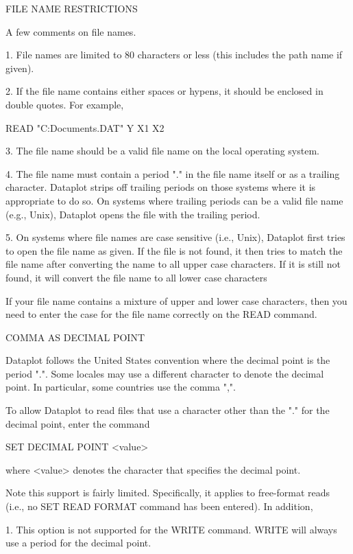 FILE NAME RESTRICTIONS

A few comments on file names.

  1. File names are limited to 80 characters or less (this includes
     the path name if given).

  2. If the file name contains either spaces or hypens, it
     should be enclosed in double quotes.  For example,

       READ "C:\My Documents\SAMPLE.DAT"  Y X1 X2

  3. The file name should be a valid file name on the local
     operating system.

  4. The file name must contain a period "." in the file name itself
     or as a trailing character.  Dataplot strips off trailing periods
     on those systems where it is appropriate to do so.  On systems
     where trailing periods can be a valid file name (e.g., Unix),
     Dataplot opens the file with the trailing period.
 
  5. On systems where file names are case sensitive (i.e., Unix),
     Dataplot first tries to open the file name as given.  If the
     file is not found, it then tries to match the file name
     after converting the name to all upper case characters.  If
     it is still not found, it will convert the file name to all
     lower case characters

     If your file name contains a mixture of upper and lower case
     characters, then you need to enter the case for the file name
     correctly on the READ command.


COMMA AS DECIMAL POINT

Dataplot follows the United States convention where the decimal
point is the period ".".  Some locales may use a different
character to denote the decimal point.  In particular, some
countries use the comma ",".

To allow Dataplot to read files that use a character other than
the "." for the decimal point, enter the command

     SET DECIMAL POINT <value>

where <value> denotes the character that specifies the decimal
point.

Note this support is fairly limited.  Specifically, it applies
to free-format reads (i.e., no SET READ FORMAT command has been
entered).  In addition,

   1. This option is not supported for the WRITE command.  WRITE
      will always use a period for the decimal point.


